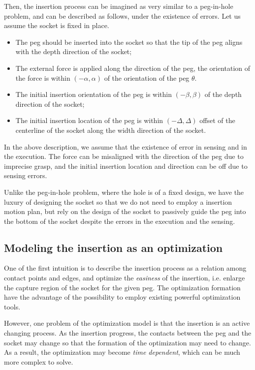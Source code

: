 \documentclass[11p]{article}
\begin{document}
Then, the insertion process can be imagined as very similar to a peg-in-hole problem, and can be described as follows, under the existence of errors. Let us assume the socket is fixed in place. 
\begin{itemize}

\item The peg should be inserted into the socket so that the tip of the peg aligns with the depth direction of the socket; 

\item The external force is applied along the direction of the peg, the orientation of the force is within $(-\alpha, \alpha)$ of the orientation of the peg $\theta$. 

\item The initial insertion orientation of the peg is within $(-\beta, \beta)$ of the depth direction of the socket; 

\item The initial insertion location of the peg is within $(-\Delta, \Delta)$ offset of the centerline of the socket along the width direction of the socket. 

\end{itemize}

In the above description, we assume that the existence of error in sensing and in the execution. The force can be misaligned with the direction of the peg due to imprecise grasp, and the initial insertion location and direction can be off due to sensing errors. 

Unlike the peg-in-hole problem, where the hole is of a fixed design, we have the luxury of designing the socket so that we do not need to employ a insertion motion plan, but rely on the design of the socket to passively guide the peg into the bottom of the socket despite the errors in the execution and the sensing. 

\subsection{Modeling the insertion as an optimization}

One of the first intuition is to describe the insertion process as a relation among contact points and edges, and optimize the {\em easiness} of the insertion, i.e. enlarge the capture region of the socket for the given peg. The optimization formation have the advantage of the possibility to employ existing powerful optimization tools. 

However, one problem of the optimization model is that the insertion is an active changing process. As the insertion progress, the contacts between the peg and the socket may change so that the formation of the optimization may need to change. As a result, the optimization may become {\em time dependent}, which can be much more complex to solve. 
\end{document}
